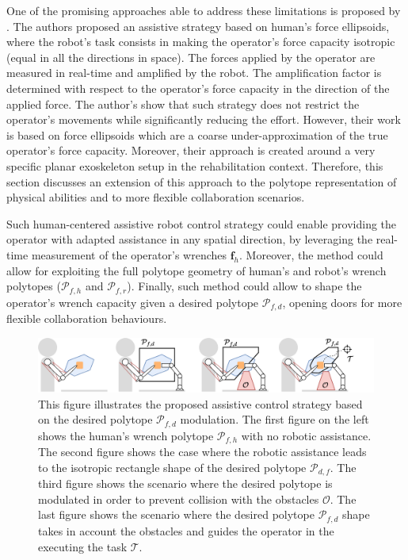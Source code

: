 One of the promising approaches able to address these limitations is proposed by \citet{petric2019assistive}.
The authors proposed an assistive strategy based on human's force ellipsoids, where the robot's task consists in making the operator's force capacity isotropic (equal in all the directions in space). The forces applied by the operator are measured in real-time and amplified by the robot. The amplification factor is determined with respect to the operator's force capacity in the direction of the applied force. The author's show that such strategy does not restrict the operator's movements while significantly reducing the effort. However, their work is based on force ellipsoids which are a coarse under-approximation of the true operator's force capacity. Moreover, their approach is created around a very specific planar exoskeleton setup in the rehabilitation context. Therefore, this section discusses an extension of this approach to the polytope representation of physical abilities and to more flexible collaboration scenarios. 

Such human-centered assistive robot control strategy could enable providing the operator with adapted assistance in any spatial direction, by leveraging the real-time measurement of the operator's wrenches $\bm{f}_h$. Moreover, the method could allow for exploiting the full polytope geometry of human's and robot's wrench polytopes ($\mathcal{P}_{f,h}$ and $\mathcal{P}_{f,r}$). Finally, such method could allow to shape the operator's wrench capacity given a desired polytope $\mathcal{P}_{f,d}$, opening doors for more flexible collaboration behaviours.

\begin{figure}[!h]
    \centering
    \includegraphics[width=\linewidth]{Papers/lichie/modulatio_all.pdf}
    \caption{This figure illustrates the proposed assistive control strategy based on the desired polytope $\mathcal{P}_{f,d}$ modulation. The first figure on the left shows the human's wrench polytope $\mathcal{P}_{f,h}$ with no robotic assistance. The second figure shows the case where the robotic assistance leads to the isotropic rectangle shape of the desired polytope $\mathcal{P}_{d,f}$. The third figure shows the scenario where the desired polytope is modulated in order to prevent collision with the obstacles $\mathcal{O}$. The last figure shows the scenario where the desired polytope $\mathcal{P}_{f,d}$ shape takes in account the obstacles and guides the operator in the executing the task $\mathcal{T}$.}
    \label{fig:desired_modulaiton}
\end{figure}

